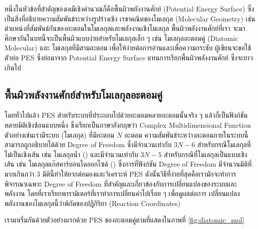 หนึ่งในหัวข้อที่สำคัญของเคมีเชิงคำนวณก็คือพื้นผิวพลังงานศักย์ (Potential Energy Surface) ซึ่งเป็นสิ่งที่อธิบายความสัมพันธ์ระหว่างรูปร่างเชิง%
เรขาคณิตของโมเลกุล (Molecular Geometry) เช่น ตำแหน่งที่สัมพันธ์กันของอะตอมในโมเลกุลและพลังงานเชิงโมเลกุล พื้นผิวพลังงานศักย์ที่เรา%
จะมาศึกษากันในบทนี้จะเป็นพื้นผิวแบบง่ายสำหรับโมเลกุลเล็ก ๆ เช่น โมเลกุลอะตอมคู่ (Diatomic Molecular) และ โมเลกุลที่มีสามอะตอม
เพื่อให้ง่ายต่อการอ่านและเพื่อความกระชับ ผู้เขียนจะขอใช้ตัวย่อ PES ซึ่งย่อมาจาก Potential Energy Surface แทนการเรียกพื้นผิวพลังงานศักย์%
ซึ่งจะยาวเกินไป

\subsection{พื้นผิวพลังงานศักย์สำหรับโมเลกุลอะตอมคู่}
\label{ssec:pes_di_atomic}

โดยทั่วไปแล้ว PES สำหรับระบบที่ประกอบไปด้วยอะตอมหลายอะตอมนั้นจริง ๆ แล้วก็เป็นฟังก์ชันหลายมิติเชิงซ้อนแบบหนึ่ง ซึ่งเรียกเป็นภาษาอังกฤษว่า
Complex Multidimensional Function ตัวอย่างเช่นเรามีระบบ (โมเลกุล) ที่มีอะตอม $N$ อะตอม ความสัมพันธ์ระหว่างอะตอมภายในระบบนี้%
สามารถถูกอธิบายได้ด้วย Degree of Freedom ซึ่งมีจำนวนเท่ากับ $3N-6$ สำหรับกรณีโมเลกุลที่ไม่เป็นเชิงเส้น เช่น โมเลกุลน้ำ ()
และมีจำนวนเท่ากับ $3N-5$ สำหรับกรณีที่โมเลกุลเป็นแบบเชิงเส้น เช่น โมเลกุลแก๊สคาร์บอนไดออกไซด์ () ซึ่งการที่ฟังก์ชัน Degree
of Freedom มีจำนวนมิติที่มากเกินกว่า 3 มิตินี้ทำให้ยากต่อมองและวิเคราะห์ PES ดังนั้นวิธีที่ง่ายที่สุดคือเรามักจะทำการพิจารณาเฉพาะ Degree of
Freedom ที่สำคัญและเกี่ยวข้องกับการเปลี่ยนแปลงของระบบและพลังงาน โดยที่เราเรียกพารามิเตอร์ที่เราทำการเปลี่ยนค่าไปเรื่อย ๆ เพื่อดูผลต่อการ%
เปลี่ยนแปลงพลังงานของโมเลกุลนี้ว่าพิกัดของปฏิกิริยา (Reaction Coordinates)

เรามาเริ่มกันด้วยตัวอย่างแรกด้วย PES ของอะตอมคู่ตามที่แสดงในภาพที่ \ref{fig:diatomic_mol}

